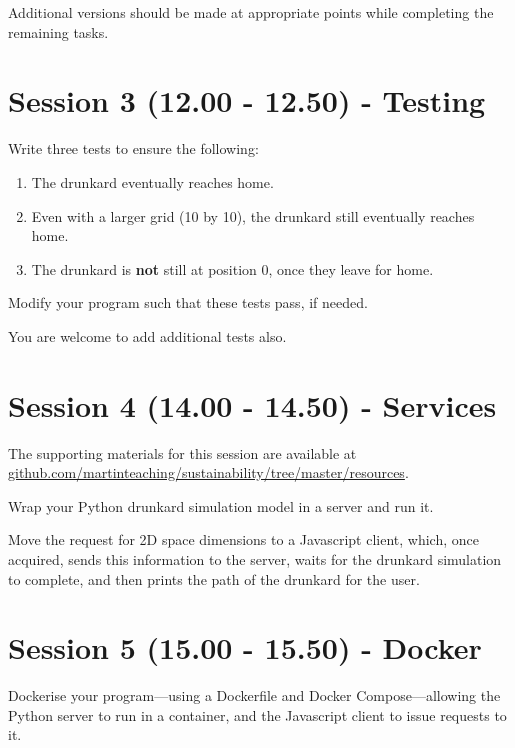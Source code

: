 \documentclass{article}
\begin{document}
Additional versions should be made at appropriate points while completing the remaining tasks.

\section{Session 3 (12.00 - 12.50) - Testing}

Write three tests to ensure the following:

\begin{enumerate}

    \item The drunkard eventually reaches home.

    \item Even with a larger grid (10 by 10), the drunkard still eventually reaches home.

    \item The drunkard is \textbf{not} still at position 0, once they leave for home.

\end{enumerate}

Modify your program such that these tests pass, if needed.

You are welcome to add additional tests also.

\section{Session 4 (14.00 - 14.50) - Services}

The supporting materials for this session are available at \newline
\href{https://github.com/martinteaching/sustainability/tree/master/resources}{github.com/martinteaching/sustainability/tree/master/resources}.

Wrap your Python drunkard simulation model in a server and run it.

Move the request for 2D space dimensions to a Javascript client, which, once acquired, sends this information to the server, waits for the drunkard simulation to complete, and then prints the path of the drunkard for the user.

\section{Session 5 (15.00 - 15.50) - Docker}

Dockerise your program---using a Dockerfile and Docker Compose---allowing the Python server to run in a container, and the Javascript client to issue requests to it.
\end{document}
